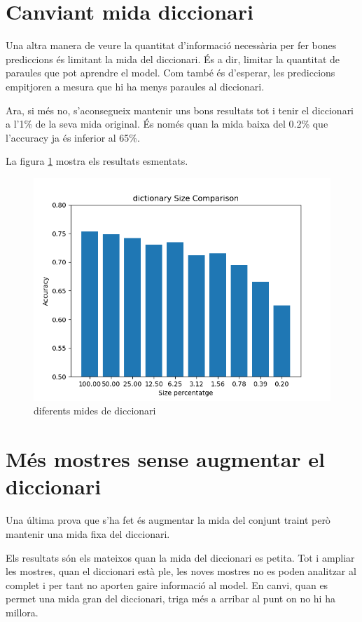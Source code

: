 \section{Canviant mida diccionari}
Una altra manera de veure la quantitat d’informació necessària per fer bones prediccions és limitant la mida del diccionari. És a dir, limitar la quantitat de paraules que pot aprendre el model. Com també és d’esperar, les prediccions empitjoren a mesura que hi ha menys paraules al diccionari. 

Ara, si més no, s’aconsegueix mantenir uns bons resultats tot i tenir el diccionari a l’1\% de la seva mida original. És només quan la mida baixa del 0.2\% que l’accuracy ja és inferior al 65\%.

La figura \ref{fig:dic_size} mostra els resultats esmentats.
\begin{figure}[ht]
    \centering
    \includegraphics[width=\textwidth,height=\textheight,keepaspectratio]{images/image4.png}
    \caption{diferents mides de diccionari}
    \label{fig:dic_size}
\end{figure}
\section{Més mostres sense augmentar el diccionari}
Una última prova que s’ha fet és augmentar la mida del conjunt traint però mantenir una mida fixa del diccionari. 

Els resultats són els mateixos quan la mida del diccionari es petita. Tot i ampliar les mostres, quan el diccionari està ple, les noves mostres no es poden analitzar al complet i per tant no aporten gaire informació al model. En canvi, quan es permet una mida gran del diccionari, triga més a arribar al punt on no hi ha millora.
